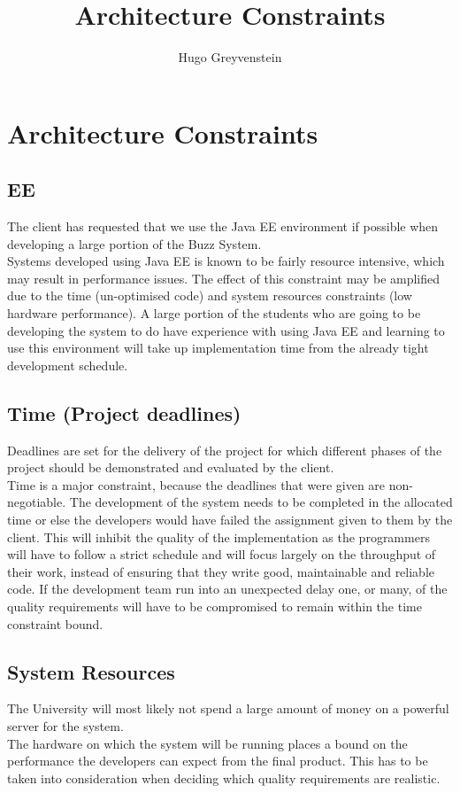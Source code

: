 \documentclass[12pt, a4paper]{article}
\begin{document}
\title{Architecture Constraints}
\author{Hugo Greyvenstein}
\maketitle
\pagebreak

\tableofcontents
\pagebreak

\section{Architecture Constraints}
\subsection{EE}
The client has requested that we use the Java EE environment if possible when developing a large portion of the Buzz System. \\

Systems developed using Java EE is known to be fairly resource intensive, which may result in performance issues. The effect of this constraint may be amplified due to the time (un-optimised code) and system resources constraints (low hardware performance). A large portion of the students who are going to be developing the system to do have experience with using Java EE and learning to use this environment will take up implementation time from the already tight development schedule.

\subsection{Time (Project deadlines)}
Deadlines are set for the delivery of the project for which different phases of the project should be demonstrated and evaluated by the client. \\

Time is a major constraint, because the deadlines that were given are non-negotiable. The development of the system needs to be completed in the allocated time or else the developers would have failed the assignment given to them by the client. This will inhibit the quality of the implementation as the programmers will have to follow a strict schedule and will focus largely on the throughput of their work, instead of ensuring that they write good, maintainable and reliable code. If the development team run into an unexpected delay one, or many, of the quality requirements will have to be compromised to remain within the time constraint bound.

\subsection{System Resources}
The University will most likely not spend a large amount of money on a powerful server for the system.\\

The hardware on which the system will be running places a bound on the performance the developers can expect from the final product. This has to be taken into consideration when deciding which quality requirements are realistic.
\end{document}
